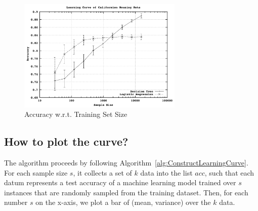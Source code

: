 \begin{figure}[!htbp]
    \centering
    \includegraphics[width=0.7\textwidth]{images/safetyIssues/learningCurve.png}
    \caption{Accuracy w.r.t. Training Set Size \cite{10.1162/153244304322972694}}
    \label{fig:learning_curve}
\end{figure}

\subsection*{How to plot the curve?}

The algorithm proceeds by following Algorithm~\ref{alg:ConstructLearningCurve}. For each sample size $s$, it collects a set of $k$ data into the list $acc$, such that each datum represents a test accuracy of a machine learning model trained over $s$ instances that are randomly sampled from the training dataset. Then, for each number $s$ on the x-axis, we plot a bar of (mean, variance) over the $k$ data. 

\begin{algorithm}
\SetAlgoLined

 \caption{$\functionname{ConstructLearaningCurve}$($D_{train},D_{test}$), where $D_{train}$ is a set of training instances and $D_{test}$ is a set of test instances}
 \label{alg:ConstructLearningCurve}
\end{algorithm}



